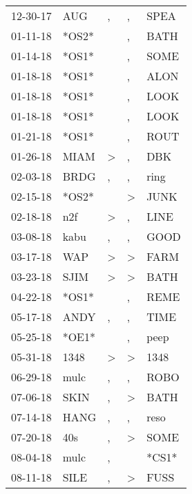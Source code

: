 \begin{supertabular}{lllll}
 12-30-17 &    AUG &                , &                , &   SPEA \\
 01-11-18 &  *OS2* &                  &                , &   BATH \\
 01-14-18 &  *OS1* &                  &                , &   SOME \\
 01-18-18 &  *OS1* &                  &                , &   ALON \\
 01-18-18 &  *OS1* &                  &                , &   LOOK \\
 01-18-18 &  *OS1* &                  &                , &   LOOK \\
 01-21-18 &  *OS1* &                  &                , &   ROUT \\
 01-26-18 &   MIAM &     \textgreater &                , &    DBK \\
 02-03-18 &   BRDG &                , &                , &   ring \\
 02-15-18 &  *OS2* &                  &     \textgreater &   JUNK \\
 02-18-18 &    n2f &     \textgreater &                , &   LINE \\
 03-08-18 &   kabu &                , &                , &   GOOD \\
 03-17-18 &    WAP &     \textgreater &     \textgreater &   FARM \\
 03-23-18 &   SJIM &     \textgreater &     \textgreater &   BATH \\
 04-22-18 &  *OS1* &                  &                , &   REME \\
 05-17-18 &   ANDY &                , &                , &   TIME \\
 05-25-18 &  *OE1* &                  &                , &   peep \\
 05-31-18 &   1348 &     \textgreater &     \textgreater &   1348 \\
 06-29-18 &   mulc &                , &                , &   ROBO \\
 07-06-18 &   SKIN &                , &     \textgreater &   BATH \\
 07-14-18 &   HANG &                , &                , &   reso \\
 07-20-18 &    40s &                , &     \textgreater &   SOME \\
 08-04-18 &   mulc &                , &                  &  *CS1* \\
 08-11-18 &   SILE &                , &     \textgreater &   FUSS \\

\end{supertabular}
